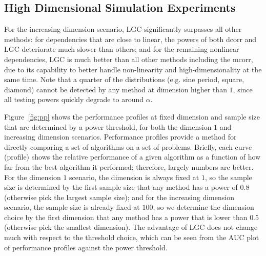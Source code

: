 \documentclass[11pt]{article}
\begin{document}
\subsection{High Dimensional Simulation Experiments}
\label{numer1}


For the increasing dimension scenario, LGC significantly surpasses all other methods: for dependencies that are close to linear, the powers of both dcorr and LGC deteriorate much slower than others; and for the remaining nonlinear dependencies, LGC is much better than all other methods including the mcorr, due to its capability to better handle non-linearity and high-dimensionality at the same time. Note that a quarter of the distributions (e.g. sine period, square, diamond) cannot be detected by any method at dimension higher than $1$, since all testing powers quickly degrade to around $\alpha$.



Figure~\ref{fig:pp} shows the performance profiles \cite{DolanMore2002} at fixed dimension and sample size that are determined by a power threshold, for both the dimension $1$ and increasing dimension scenarios. Performance profiles provide a method for directly comparing a set of algorithms on a set of problems.  Briefly, each curve (profile) shows the relative performance of a given algorithm as a function of how far from the best algorithm it performed; therefore, largely numbers are better.  For the dimension $1$ scenario, the dimension is always fixed at $1$, so the sample size is determined by the first sample size that any method has a power of $0.8$ (otherwise pick the largest sample size); and for the increasing dimension scenario, the sample size is already fixed at $100$, so we determine the dimension choice by the first dimension that any method has a power that is lower than $0.5$ (otherwise pick the smallest dimension). The advantage of LGC does not change much with respect to the threshold choice, which can be seen from the AUC plot of performance profiles against the power threshold.
\end{document}
